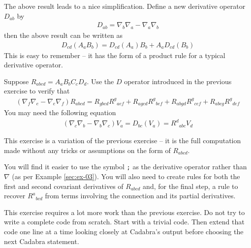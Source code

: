 \documentclass[a4paper,12pt]{article}
\numberwithin{equation}{section}%
\begin{document}
\begin{Exercises}
\begin{Exercise}
      The above result leads to a nice simplification. Define a new derivative operator
      $D_{ab}$ by
      \begin{align*}
         D_{ab} = \nabla_{b}\nabla_{a} - \nabla_{a}\nabla_{b}
      \end{align*}
      then the above result can be written as
      \begin{align*}
         D_{cd}\left(A_{a}B_{b}\right)
         = D_{cd}\left(A_{a}\right) B_{b}
         + A_{a} D_{cd}\left(B_{b}\right)
      \end{align*}
      This is easy to remember -- it has the form of a product rule for a typical
      derivative operator.
   \end{Exercise}

   \begin{Exercise}
      Suppose $R_{abcd} = A_{a} B_{b} C_{c} D_{d}$. Use the $D$ operator introduced in
      the previous exercise to verify that
      \begin{align*}
         \left(\nabla_{f}\nabla_{e}
              -\nabla_{e}\nabla_{f}\right) R_{abcd}
         = R_{g b c d} R^{g}{}_{a e f}
         + R_{a g c d} R^{g}{}_{b e f}
         + R_{a b g d} R^{g}{}_{c e f}
         + R_{a b c g} R^{g}{}_{d e f}
      \end{align*}
      You may need the following equation
      \begin{align*}
         \left(\nabla_{c}\nabla_{b}
              -\nabla_{b}\nabla_{c}\right) V_{a}
         = D_{b c} \left(V_{a}\right)
         = R^{d}{}_{a b c} V_{d}
      \end{align*}
   \end{Exercise}

   \begin{Exercise}
      This exercise is a variation of the previous exercise -- it is the full computation
      made without any tricks or assumptions on the form of $R_{abcd}$.

      You will find it easier to use the symbol \verb|;| as the derivative operator rather
      than $\nabla$ (as per Example \ref{sec:ex-03}). You will also need to create rules for
      both the first and second covariant derivatives of $R_{abcd}$ and, for the final step,
      a rule to recover $R^{a}{}_{bcd}$ from terms involving the connection and its partial
      derivatives.

      This exercise requires a lot more work than the previous exercise. Do not try to
      write a complete code from scratch. Start with a trivial code. Then extend that code
      one line at a time looking closely at Cadabra's output before choosing the next
      Cadabra statement.
   \end{Exercise}


\end{Exercises}
\end{document}
